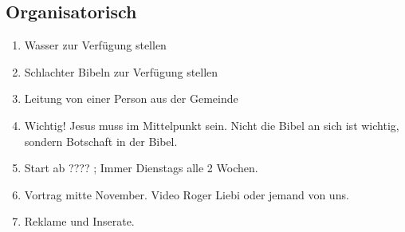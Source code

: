 \documentclass{mybib}
\begin{document}
    \subsection{Organisatorisch}
    \begin{enumerate}
        \item Wasser zur Verfügung stellen
        \item Schlachter Bibeln zur Verfügung stellen
        \item Leitung von einer Person aus der Gemeinde
        \item Wichtig! Jesus muss im Mittelpunkt sein. Nicht die Bibel an sich ist wichtig, sondern Botschaft in der Bibel.
        \item Start ab ???? ; Immer Dienstags alle 2 Wochen.
        \item Vortrag mitte November. Video Roger Liebi oder jemand von uns.
        \item Reklame und Inserate.
    \end{enumerate}
     
    
\end{document}
